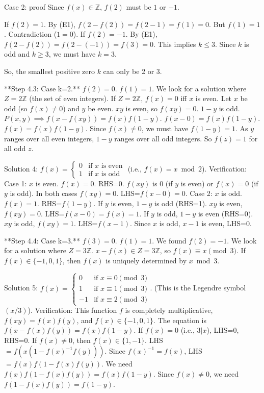 \documentclass{article} %
\begin{document}
\begin{promptbox}{Case 2: proof}
Since $f(x) \in \mathbb{Z}$, $f(2)$ must be $1$ or $-1$.

If $f(2)=1$. By (E1), $f(2-f(2)) = f(2-1) = f(1) = 0$. But $f(1)=1$. Contradiction ($1=0$).
If $f(2)=-1$. By (E1), $f(2-f(2)) = f(2-(-1)) = f(3) = 0$.
This implies $k \le 3$. Since $k$ is odd and $k \ge 3$, we must have $k=3$.

So, the smallest positive zero $k$ can only be 2 or 3.

**Step 4.3: Case k=2.**
$f(2)=0$. $f(1)=1$. We look for a solution where $Z=2\mathbb{Z}$ (the set of even integers).
If $Z=2\mathbb{Z}$, $f(x)=0$ iff $x$ is even.
Let $x$ be odd (so $f(x) \neq 0$) and $y$ be even.
$xy$ is even, so $f(xy)=0$. $1-y$ is odd.
$P(x, y) \implies f(x-f(xy)) = f(x)f(1-y)$.
$f(x-0) = f(x)f(1-y)$.
$f(x) = f(x)f(1-y)$.
Since $f(x) \neq 0$, we must have $f(1-y)=1$.
As $y$ ranges over all even integers, $1-y$ ranges over all odd integers.
So $f(z)=1$ for all odd $z$.

Solution 4: $f(x) = \begin{cases} 0 & \text{if } x \text{ is even} \\ 1 & \text{if } x \text{ is odd} \end{cases}$ (i.e., $f(x) = x \bmod 2$).
Verification:
Case 1: $x$ is even. $f(x)=0$. RHS=0. $f(xy)$ is 0 (if $y$ is even) or $f(x)=0$ (if $y$ is odd). In both cases $f(xy)=0$. LHS=$f(x-0)=0$.
Case 2: $x$ is odd. $f(x)=1$. RHS=$f(1-y)$.
If $y$ is even, $1-y$ is odd (RHS=1). $xy$ is even, $f(xy)=0$. LHS=$f(x-0)=f(x)=1$.
If $y$ is odd, $1-y$ is even (RHS=0). $xy$ is odd, $f(xy)=1$. LHS=$f(x-1)$. Since $x$ is odd, $x-1$ is even, LHS=0.

**Step 4.4: Case k=3.**
$f(3)=0$. $f(1)=1$. We found $f(2)=-1$.
We look for a solution where $Z=3\mathbb{Z}$.
$x-f(x) \in Z=3\mathbb{Z}$, so $f(x) \equiv x \pmod 3$.
If $f(x) \in \{-1, 0, 1\}$, then $f(x)$ is uniquely determined by $x \bmod 3$.

Solution 5: $f(x) = \begin{cases} 0 & \text{if } x \equiv 0 \pmod 3 \\ 1 & \text{if } x \equiv 1 \pmod 3 \\ -1 & \text{if } x \equiv 2 \pmod 3 \end{cases}$. (This is the Legendre symbol $(x/3)$).
Verification:
This function $f$ is completely multiplicative, $f(xy)=f(x)f(y)$, and $f(x) \in \{-1, 0, 1\}$.
The equation is $f(x-f(x)f(y)) = f(x)f(1-y)$.
If $f(x)=0$ (i.e., $3|x$), LHS=0, RHS=0.
If $f(x) \neq 0$, then $f(x) \in \{1, -1\}$.
LHS $= f(x(1-f(x)^{-1}f(y)))$. Since $f(x)^{-1}=f(x)$,
LHS $= f(x) f(1-f(x)f(y))$.
We need $f(x) f(1-f(x)f(y)) = f(x)f(1-y)$.
Since $f(x) \neq 0$, we need $f(1-f(x)f(y)) = f(1-y)$.


\end{promptbox}
\end{document}
